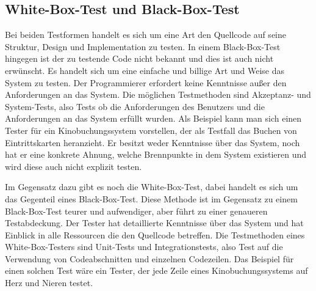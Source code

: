 \subsection{White-Box-Test und Black-Box-Test}
Bei beiden Testformen handelt es sich um eine Art den Quellcode auf seine Struktur, Design und Implementation zu testen. 
In einem Black-Box-Test hingegen ist der zu testende Code nicht bekannt und dies ist auch nicht erwünscht. 
Es handelt sich um eine einfache und billige Art und Weise das System zu testen. 
Der Programmierer erfordert keine Kenntnisse außer den Anforderungen an das System. Die möglichen Testmethoden sind Akzeptanz- und System-Tests, also Tests ob die Anforderungen des Benutzers und die Anforderungen an das System erfüllt wurden.  
Als Beispiel kann man sich einen Tester für ein Kinobuchungssystem vorstellen, der als Testfall das Buchen von Eintrittskarten heranzieht. 
Er besitzt weder Kenntnisse über das System, noch hat er eine konkrete Ahnung, welche Brennpunkte in dem System existieren und wird diese auch nicht explizit testen. 

Im Gegensatz dazu gibt es noch die White-Box-Test, dabei handelt es sich um das Gegenteil eines Black-Box-Test.
Diese Methode ist im Gegensatz zu einem Black-Box-Test teurer und aufwendiger, aber führt zu einer genaueren Testabdeckung.
Der Tester hat detaillierte Kenntnisse über das System und hat Einblick in alle Ressourcen die den Quellcode betreffen.  
Die Testmethoden eines White-Box-Testers sind Unit-Tests und Integrationstests, also Test auf die Verwendung von Codeabschnitten und einzelnen Codezeilen.
Das Beispiel für einen solchen Test wäre ein Tester, der jede Zeile eines Kinobuchungssystems auf Herz und Nieren testet.

